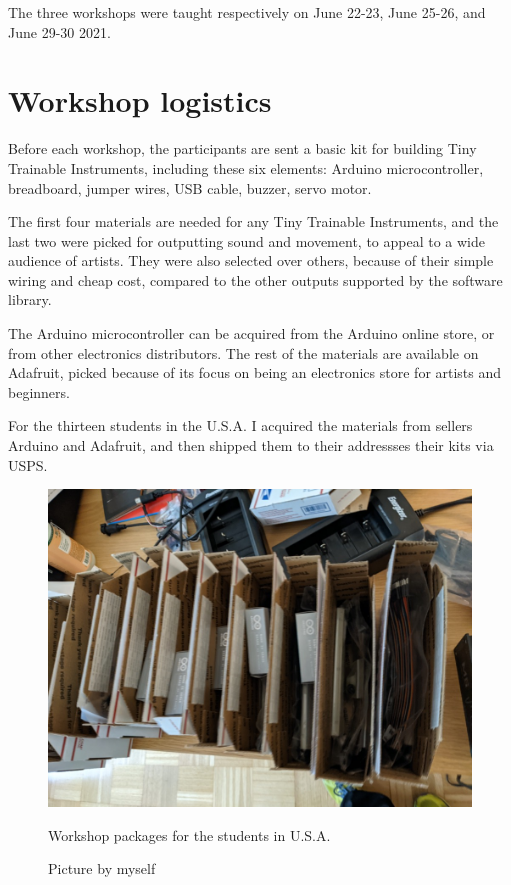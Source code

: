 The three workshops were taught respectively on June 22-23, June 25-26, and June 29-30 2021.

\section{Workshop logistics}

Before each workshop, the participants are sent a basic kit for building Tiny Trainable Instruments, including these six elements: Arduino microcontroller, breadboard, jumper wires, USB cable, buzzer, servo motor.

The first four materials are needed for any Tiny Trainable Instruments, and the last two were picked for outputting sound and movement, to appeal to a wide audience of artists. They were also selected over others, because of their simple wiring and cheap cost, compared to the other outputs supported by the software library.

The Arduino microcontroller can be acquired from the Arduino online store, or from other electronics distributors. The rest of the materials are available on Adafruit, picked because of its focus on being an electronics store for artists and beginners.

For the thirteen students in the U.S.A. I acquired the materials from sellers Arduino and Adafruit, and then shipped them to their addressses their kits via \acrfull{USPS}.

\begin{figure}[ht]
  \centering
  \includegraphics[width=0.75\linewidth,height=0.25\textheight,keepaspectratio]{images/workshop-packages.jpg}
  \caption{Workshop packages for the students in U.S.A.}
  \caption*{Picture by myself}
  \label{fig:workshop-packages-usa}
\end{figure}

